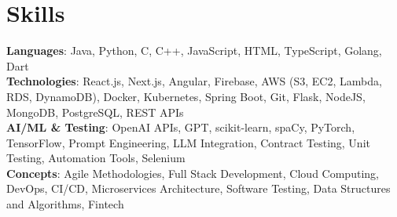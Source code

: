 \documentclass[letterpaper,11pt]{article}
\begin{document}
\section{Skills}
 \begin{itemize}[leftmargin=0.15in, label={}]
    \small{\item{
     \textbf{Languages}{: Java, Python, C, C++, JavaScript, HTML, TypeScript, Golang, Dart} \\
     \textbf{Technologies}{: React.js, Next.js, Angular, Firebase, AWS (S3, EC2, Lambda, RDS, DynamoDB), Docker, Kubernetes, Spring Boot, Git, Flask, NodeJS, MongoDB, PostgreSQL, REST APIs} \\
     \textbf{AI/ML \& Testing}{: OpenAI APIs, GPT, scikit-learn, spaCy, PyTorch, TensorFlow, Prompt Engineering, LLM Integration, Contract Testing, Unit Testing, Automation Tools, Selenium} \\
     \textbf{Concepts}{: Agile Methodologies, Full Stack Development, Cloud Computing, DevOps, CI/CD, Microservices Architecture, Software Testing, Data Structures and Algorithms, Fintech} }}
 \end{itemize}
 
%
\end{document}
